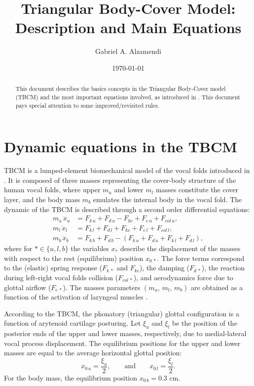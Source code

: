\documentclass[a4paper,10pt]{article}
\title{Triangular Body-Cover Model: \\ Description and Main Equations}
\author{Gabriel A. Alzamendi}
\date{\today}
\begin{document}
\maketitle

\begin{abstract}
 This document describes the basics concepts in the Triangular Body-Cover model (TBCM) 
 and the most important equations involved, as introduced in \cite{galindo_modeling_2017}. 
 This document pays special attention to some improved/revisited rules.
\end{abstract}

\section{Dynamic equations in the TBCM}
TBCM is a lumped-element biomechanical model of the vocal folds introduced in  \cite{galindo_modeling_2017}. 
It is composed of three masses representing the cover-body structure of the human vocal folds, 
where upper $m_{u}$ and lower $m_{l}$ masses constitute the cover layer,
and the body mass $m_{b}$ emulates the internal body in the vocal fold. 
The dynamic of the TBCM is described through a second order differential equations:
\begin{equation} \label{Eq_S1s0_01}
  \begin{aligned}
    m_{u} \, \ddot{x}_{u} &= F_{k\,u} + F_{d\,u} - F_{kc} + F_{e\,u} + F_{col\,u}, \\
    m_{l} \, \ddot{x}_{l} &= F_{k\,l} + F_{d\,l} + F_{kc} + F_{e\,l} + F_{col\,l}, \\
    m_{b} \, \ddot{x}_{b} &= F_{k\,b} + F_{d\,b} - (F_{k\,u} + F_{d\,u} + F_{k\,l} + F_{d\,l}),
  \end{aligned}
\end{equation}
where for $* \in \{u,l,b\}$ the variables $x_{*}$ describe the displacement of the masses with respect to 
the rest (equilibrium) position $x_{0\,*}$.
The force terms correspond to the (elastic) spring response ($F_{k\,*}$ and $F_{kc}$), the damping ($F_{d\,*}$), 
the reaction during left-right vocal folds collision ($F_{col\,*}$), and aerodynamics force due to 
glottal airflow ($F_{e\,*}$). The masses parameters $(m_{u}, \, m_{l}, \, m_{b} )$ are obtained as a function
of the activation of laryngeal muscles \cite{titze_rules_2002}.

According to the TBCM, the phonatory (triangular) glottal configuration is a function of arytenoid cartilage posturing. 
Let $\xi_{u}$ and $\xi_{l}$ be the position of the posterior ends of the upper and lower masses, 
respectively, due to medial-lateral vocal process displacement. 
The equilibrium positions for the upper and lower masses are equal to the average horizontal glottal position:
\begin{equation} \label{Eq_S1s0_02}
  x_{0\,u} = \frac{\xi_{u}}{2}, \qquad \text{and} \qquad
  x_{0\,l} = \frac{\xi_{l}}{2}.
\end{equation}
For the body mass, the equilibrium position $x_{0\,b} = 0.3$ cm.
\end{document}
